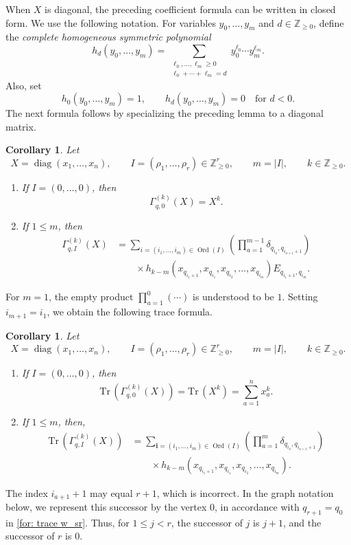 \documentclass[11pt,reqno]{amsart}
\newtheorem{corollary}[theorem]{Corollary}
\theoremstyle{definition}
\newcommand{\bbZ}{\mathbb{Z}}
\newcommand{\Tr}{\mathrm{Tr} \,}
\newcommand{\Ord}{\operatorname{Ord}}
\newcommand{\bfi}{\mathbf{i}}
\begin{document}
When \(X\) is diagonal, the preceding coefficient formula can be written in closed form.  We use the following notation.
For variables \(y_0,\dots,y_m\) and \(d\in\bbZ_{\geq 0}\), define the {\it complete
homogeneous symmetric polynomial}
\[
h_d(y_0,\dots,y_m)
=
\sum_{\substack{\ell_0,\dots,\ell_m\geq 0\\
\ell_0+\cdots+\ell_m=d}}
y_0^{\ell_0}\cdots y_m^{\ell_m}.
\]
Also, set
\[
	h_0(y_0,\dots,y_m)=1,
	\qquad
	h_d(y_0,\dots,y_m)=0 \quad \text{for } d<0.
\]
The next formula follows by specializing the preceding lemma to a diagonal matrix.

\begin{corollary}
Let
\[
X=\operatorname{diag}(x_1,\dots,x_n),
\qquad
I=(\rho_1,\dots,\rho_r)\in\bbZ_{\geq 0}^r,
\qquad
m=|I|,
\qquad k\in\bbZ_{\geq0}.
\]
\begin{enumerate}
\item[$(1)$]
If \(I=(0,\dots,0)\), then
\[
\Gamma_{q,0}^{(k)}(X)=X^k.
\]

\item[$(2)$]
If \(1\leq m\), then
\[
\begin{aligned}
\Gamma_{q,I}^{(k)}(X)
&=
\sum_{i=(i_1,\ldots,i_m)\in\Ord (I)}
\left(
\prod_{a=1}^{m-1}
\delta_{q_{i_a},q_{i_{a+1}+1}}
\right)
\\
&\qquad\times
h_{k-m}\left(
x_{q_{i_1+1}},
x_{q_{i_1}},
x_{q_{i_2}},
\ldots,
x_{q_{i_m}}
\right)
E_{q_{i_1+1},q_{i_m}}.
\end{aligned}
\]
\end{enumerate}
\end{corollary}





For \(m=1\), the empty product
\(\prod_{a=1}^{0}(\cdots)\)
is understood to be \(1\).  Setting \(i_{m+1}=i_1\), we obtain the following trace formula.

\begin{corollary}\label{coro: trace gamma}
Let
\[
X=\operatorname{diag}(x_1,\ldots,x_n),
\qquad
I=(\rho_1,\ldots,\rho_r)\in\bbZ_{\geq0}^r,
\qquad
m=|I|,
\qquad k\in\bbZ_{\geq0}.
\]
\begin{enumerate}
\item[$(1)$]
If \(I=(0,\ldots,0)\), then
\[
\Tr\left(\Gamma_{q,0}^{(k)}(X)\right)
=
\Tr(X^k)
=
\sum_{a=1}^n x_a^k.
\]

\item[$(2)$]
If \(1\leq m\), then, 
\[
\begin{aligned}
\Tr\left(\Gamma_{q,I}^{(k)}(X)\right)
&=
\sum_{\bfi=(i_1,\ldots,i_m)\in\Ord(I)}
\left(
\prod_{a=1}^{m}
\delta_{q_{i_a},q_{i_{a+1}+1}}
\right)\\
&\qquad\times
h_{k-m}\left(
 x_{q_{i_1+1}},
 x_{q_{i_1}},
 x_{q_{i_2}},
 \ldots,
 x_{q_{i_m}}
\right).
\end{aligned}
\]
\end{enumerate}
\end{corollary}
The  index \(i_{a+1}+1\) may equal \(r+1\),
which is incorrect.
In the graph notation below, we represent this successor by the
vertex \(0\), in accordance with \(q_{r+1}=q_0\) in
\eqref{for: trace w_sr}.  Thus, for \(1\leq j<r\), the successor
of \(j\) is \(j+1\), and the successor of \(r\) is \(0\).
\end{document}
